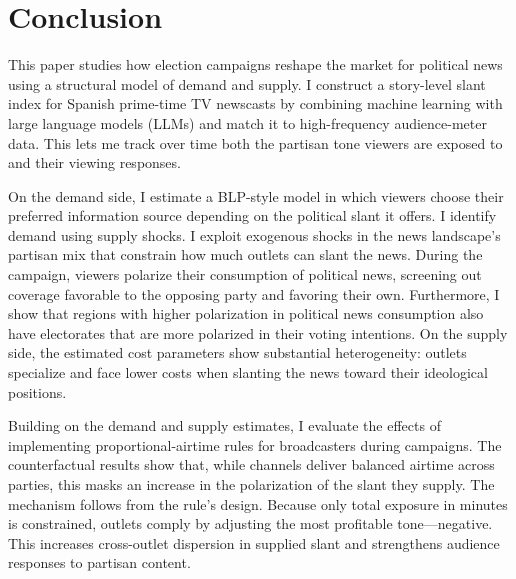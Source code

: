 \documentclass[12pt]{article}
\begin{document}
	
	\section{Conclusion}
	\label{sec:conclusion}
	

This paper studies how election campaigns reshape the market for political news using a structural model of demand and supply. I construct a story-level slant index for Spanish prime-time TV newscasts by combining machine learning with large language models (LLMs) and match it to high-frequency audience-meter data. This lets me track over time both the partisan tone viewers are exposed to and their viewing responses.


On the demand side, I estimate a BLP-style model in which viewers choose their preferred information source depending on the political slant it offers. I identify demand using supply shocks. I exploit exogenous shocks in the news landscape’s partisan mix that constrain how much outlets can slant the news. During the campaign, viewers polarize their consumption of political news, screening out coverage favorable to the opposing party and favoring their own. Furthermore, I show that regions with higher polarization in political news consumption also have electorates that are more polarized in their voting intentions. On the supply side, the estimated cost parameters show substantial heterogeneity: outlets specialize and face lower costs when slanting the news toward their ideological positions.







Building on the demand and supply estimates, I evaluate the effects of implementing proportional-airtime rules for broadcasters during campaigns. The counterfactual results show that, while channels deliver balanced airtime across parties, this masks an increase in the polarization of the slant they supply. The mechanism follows from the rule’s design. Because only total exposure in minutes is constrained, outlets comply by adjusting the most profitable tone—negative. This increases cross-outlet dispersion in supplied slant and strengthens audience responses to partisan content.
\end{document}
